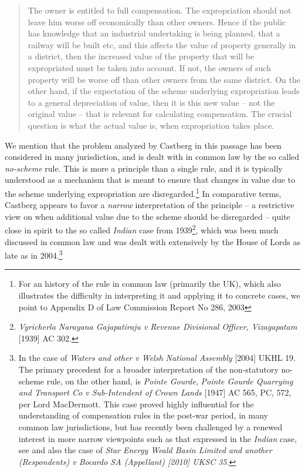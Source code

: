 \begin{quote}
The owner is entitled to full compensation. The expropriation should not leave him worse off economically than other owners. Hence if the public has knowledge that an industrial undertaking is being planned, that a railway will be built etc, and this affects the value of property generally in a district, then the increased value of the property that will be expropriated must be taken into account. If not, the owners of such property will be worse off than other owners from the same district. On the other hand, if the expectation of the scheme underlying expropriation leads to a general depreciation of value, then it is this new value -- not the original value -- that is relevant for calculating compensation. The crucial question is what the actual value is, when expropriation takes place.
\end{quote}

We mention that the problem analyzed by Castberg in this passage has been considered in many jurisdiction, and is dealt with in common law by the so called \emph{no-scheme} rule. This is more a principle than a single rule, and it is typically understood as a mechanism that is meant to ensure that changes in value due to the scheme underlying expropriation are disregarded.\footnote{For an history of the rule in common law (primarily the UK), which also illustrates the difficulty in interpreting it and applying it to concrete cases, we point to Appendix D of Law Commission Report No 286, 2003} In comparative terms, Castberg appears to favor a \emph{narrow} interpretation of the principle -- a restrictive view on when additional value due to the scheme should be disregarded -- quite close in spirit to the so called \emph{Indian} case from 1939\footnote{\emph{Vyricherla Narayana Gajapatiraju v Revenue Divisional
Officer, Vizagapatam} [1939] AC 302.}, which was been much discussed in common law and was dealt with extensively by the House of Lords as late as in 2004.\footnote{In the case of \emph{Waters and other v Welsh National Assembly} [2004] UKHL 19. The primary precedent for a broader interpretation of the non-statutory no-scheme rule, on the other hand, is \emph{Pointe Gourde}, \emph{Pointe Gourde Quarrying and Transport Co v Sub-Intendent of Crown Lands} [1947] AC 565, PC, 572, per Lord MacDermott. This case proved highly influential for the understanding of compensation rules in the post-war period, in many common law jurisdictions, but has recently been challenged by a renewed interest in more narrow viewpoints such as that expressed in the \emph{Indian} case, see  \cite{newuk} and also the case of \emph{Star Energy Weald Basin Limited and another (Respondents) v Bocardo SA (Appellant) [2010] UKSC 35}.}

